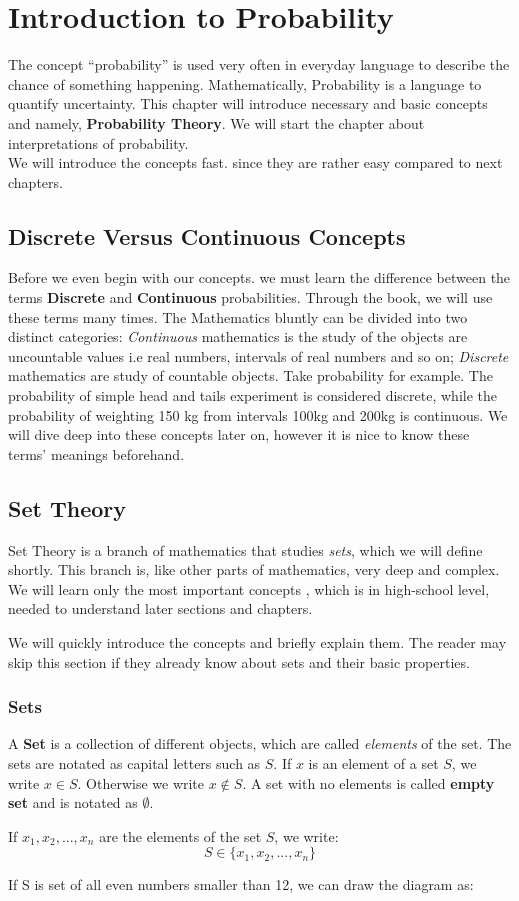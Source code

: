 \chapter{Introduction to Probability}
The concept ``probability'' is used very often in everyday language to describe the chance of something happening. Mathematically, Probability is a language to quantify uncertainty. 
This chapter will introduce necessary and basic concepts and namely, \textbf{Probability Theory}. We will start the chapter about interpretations of probability. \\
We will introduce the concepts fast. since they are rather easy compared to next chapters.
\section*{Discrete Versus Continuous Concepts}
Before we even begin with our concepts. we must learn the difference between the terms \textbf{Discrete} and \textbf{Continuous} probabilities. Through the book, we will use these terms many times.
The Mathematics bluntly can be divided into two distinct categories: \textit{Continuous} mathematics is the study of the objects are uncountable values i.e real numbers, intervals of real numbers and so on; \textit{Discrete} mathematics are study of countable objects.
Take probability for example. The probability of simple head and tails experiment is considered discrete, while the probability of weighting 150 kg from intervals 100kg and 200kg is continuous. We will dive deep into these concepts later on, however it is nice to know these terms' meanings beforehand.

\section{Set Theory}
Set Theory is a branch of mathematics that studies \textit{sets}, which we will define shortly. This branch is, like other parts of mathematics, very deep and complex. We will learn only the most important concepts , which is in high-school level, needed to understand later sections and chapters.
\par
We will quickly introduce the concepts and briefly explain them. The reader may skip this section if they already know about sets and their basic properties.

\subsection*{Sets}
A \textbf{Set} is a collection of different objects, which are called \textit{elements} of the set. The sets are notated as capital letters such as $S$.
If $x$ is an element of a set $S$, we write $x \in S$. Otherwise we write $ x \not\in S$. A set with no elements is called \textbf{empty set} and is notated as $\emptyset$. \par
If $x_1,x_2,...,x_n$ are the elements of the set $S$, we write:
$$ S \in \{x_1,x_2,...,x_n\} $$
\par
If S is set of all even numbers smaller than 12, we can draw the diagram as:



